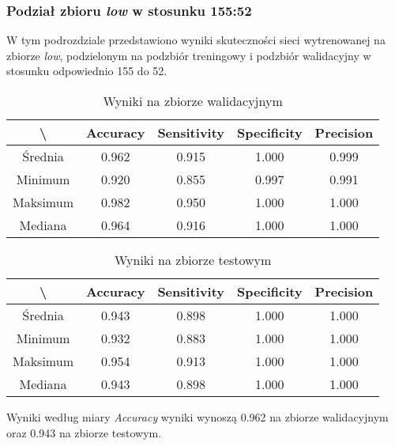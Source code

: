 \subsubsection{Podział zbioru \textit{low} w stosunku 155:52}

W tym podrozdziale przedstawiono wyniki skuteczności sieci wytrenowanej na zbiorze \textit{low}, podzielonym na podzbiór treningowy i podzbiór walidacyjny w stosunku odpowiednio 155 do 52.

\begin{table}[!h]
	\centering
	\caption{Wyniki na zbiorze walidacyjnym}
	\vspace{6pt}
	{\footnotesize
		\begin{tabular}{|c|c|c|c|c|}
      \hline \textbackslash & Accuracy & Sensitivity & Specificity & Precision \\
      \hline Średnia & 0.962 & 0.915 & 1.000 & 0.999 \\
      \hline Minimum & 0.920 & 0.855 & 0.997 & 0.991 \\
      \hline Maksimum & 0.982 & 0.950 & 1.000 & 1.000 \\
      \hline Mediana & 0.964 & 0.916 & 1.000 & 1.000 \\
      \hline
		\end{tabular}
	}
	\vspace{0pt}
\end{table}

\begin{table}[!h]
	\centering
	\caption{Wyniki na zbiorze testowym}
	\vspace{6pt}
	{\footnotesize
		\begin{tabular}{|c|c|c|c|c|}
      \hline \textbackslash & Accuracy & Sensitivity & Specificity & Precision \\
      \hline Średnia & 0.943 & 0.898 & 1.000 & 1.000 \\
      \hline Minimum & 0.932 & 0.883 & 1.000 & 1.000 \\
      \hline Maksimum & 0.954 & 0.913 & 1.000 & 1.000 \\
      \hline Mediana & 0.943 & 0.898 & 1.000 & 1.000 \\
      \hline
		\end{tabular}
	}
	\vspace{0pt}
\end{table}

Wyniki według miary \textit{Accuracy} wyniki wynoszą 0.962 na zbiorze walidacyjnym oraz 0.943 na zbiorze testowym.
